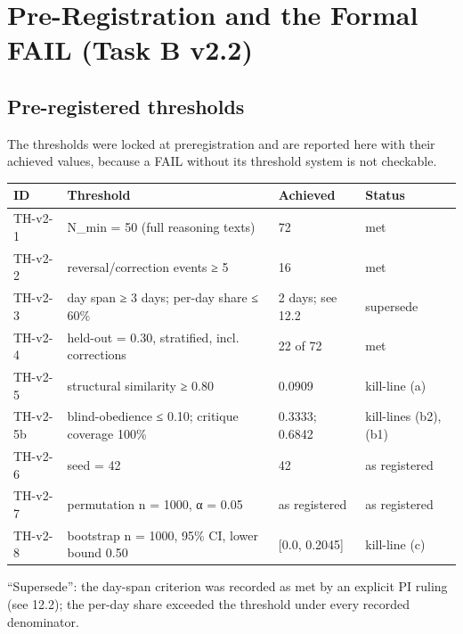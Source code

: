 \documentclass[11pt]{article}
\begin{document}
\section{Pre-Registration and the Formal FAIL (Task B v2.2)}
\label{sec:12}
\subsection{Pre-registered thresholds}
\noindent The thresholds were locked at preregistration and are reported here with their achieved values, because a FAIL without its threshold system is not checkable.\par
\begingroup\small
\noindent\begin{tabularx}{\textwidth}{@{}l >{\raggedright\arraybackslash}X l l@{}}
\toprule
\textbf{ID} & \textbf{Threshold} & \textbf{Achieved} & \textbf{Status} \\
\midrule
TH-v2-1 & N\_min = 50 (full reasoning texts) & 72 & met \\
TH-v2-2 & reversal/correction events ≥ 5 & 16 & met \\
TH-v2-3 & day span ≥ 3 days; per-day share ≤ 60\% & 2 days; see 12.2 & supersede \\
TH-v2-4 & held-out = 0.30, stratified, incl. corrections & 22 of 72 & met \\
TH-v2-5 & structural similarity ≥ 0.80 & 0.0909 & kill-line (a) \\
TH-v2-5b & blind-obedience ≤ 0.10; critique coverage 100\% & 0.3333; 0.6842 & kill-lines (b2), (b1) \\
TH-v2-6 & seed = 42 & 42 & as registered \\
TH-v2-7 & permutation n = 1000, α = 0.05 & as registered & as registered \\
TH-v2-8 & bootstrap n = 1000, 95\% CI, lower bound 0.50 & [0.0, 0.2045] & kill-line (c) \\
\bottomrule
\end{tabularx}
\endgroup
\noindent ``Supersede'': the day-span criterion was recorded as met by an explicit PI ruling (see 12.2); the per-day share exceeded the threshold under every recorded denominator.\par
\end{document}

